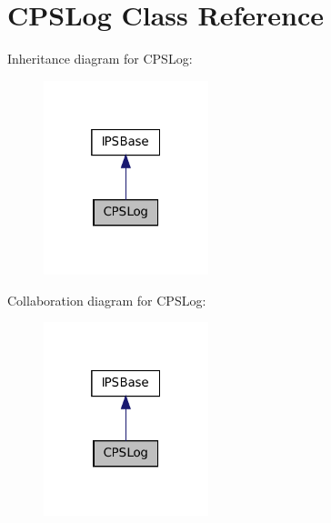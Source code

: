 \hypertarget{classCPSLog}{
\section{CPSLog Class Reference}
\label{classCPSLog}
}


Inheritance diagram for CPSLog:\nopagebreak
\begin{figure}[H]
\begin{center}
\leavevmode
\includegraphics[width=136pt]{classCPSLog__inherit__graph}
\end{center}
\end{figure}


Collaboration diagram for CPSLog:\nopagebreak
\begin{figure}[H]
\begin{center}
\leavevmode
\includegraphics[width=136pt]{classCPSLog__coll__graph}
\end{center}
\end{figure}
